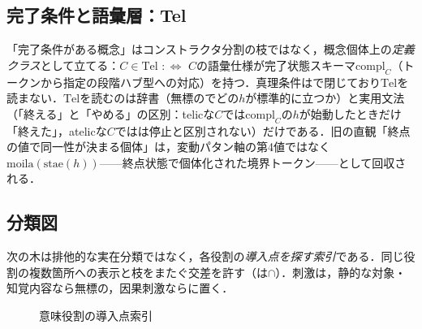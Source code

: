\documentclass[../../main-detail.tex]{subfiles}
\begin{document}
\subsection{完了条件と語彙層：Tel}
「完了条件がある概念」はコンストラクタ分割の枝ではなく，概念個体上の\emph{定義クラス}として立てる：$C\in\mathrm{Tel}$ $:\Leftrightarrow$ $C$の語彙仕様が完了状態スキーマ$\mathrm{compl}_C$（トークンから指定の段階ハブ型への対応）を持つ．真理条件はで閉じており$\mathrm{Tel}$を読まない．$\mathrm{Tel}$を読むのは辞書（無標のでどの$h$が標準的に立つか）と実用文法（「終える」と「やめる」の区別：telicな$C$では$\mathrm{compl}_C$の$h$が始動したときだけ「終えた」，atelicな$C$ではは停止と区別されない）だけである．旧の直観「終点の値で同一性が決まる個体」は，変動パタン軸の第4値ではなく$\mathrm{moila}(\mathrm{stae}(h))$——終点状態で個体化された境界トークン——として回収される．

\subsection{分類図}
次の木は排他的な実在分類ではなく，各役割の\emph{導入点を探す索引}である．同じ役割の複数箇所への表示と枝をまたぐ交差を許す（は$\cap$）．刺激は，静的な対象・知覚内容なら無標の，因果刺激ならに置く．

\begin{figure}[H]
    \centering
    \caption{意味役割の導入点索引}
\end{figure}
\end{document}
